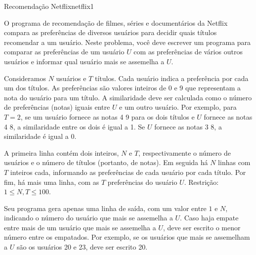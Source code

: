 \documentclass[12pt,a4paper,oneside]{article}
\begin{document}
\begin{problem}{Recomendação Netflix}{netflix}{1}

O programa de recomendação de filmes, séries e documentários da Netflix compara as preferências de diversos usuários para decidir quais títulos recomendar a um usuário. Neste problema, você deve escrever um programa para comparar as preferências de um usuário $U$ com as preferências de vários outros usuários e informar qual usuário mais se assemelha a $U$.

Consideramos $N$ usuários e $T$ títulos. Cada usuário indica a preferência por cada um dos títulos. As preferências são valores inteiros de 0 e 9 que representam a nota do usuário para um título. A similaridade deve ser calculada como o número de preferências (notas) iguais entre $U$ e um outro usuário. Por exemplo, para $T = 2$, se um usuário fornece as notas 4 9 para os dois títulos e $U$ fornece as notas 4 8, a similaridade entre os dois é igual a 1. Se $U$ fornece as notas 3 8, a similaridade é igual a 0.



\InputFile

A primeira linha contém dois inteiros, $N$ e $T$, respectivamente o número de usuários e o número de títulos (portanto, de notas). Em seguida há $N$ linhas com $T$ inteiros cada, informando as preferências de cada usuário por cada título. Por fim, há mais uma linha, com as $T$ preferências do usuário $U$. Restrição: $1 \leq N, T \leq 100$.

\OutputFile

Seu programa gera apenas uma linha de saída, com um valor entre $1$ e $N$, indicando o número do usuário que mais se assemelha a $U$. Caso haja empate entre mais de um usuário que mais se assemelha a $U$, deve ser escrito o menor número entre os empatados. Por exemplo, se os usuários que mais se assemelham a $U$ são os usuários 20 e 23, deve ser escrito 20.


\Example

\begin{example}
%
\end{example}

\begin{example}
%
\end{example}


\end{problem}
\end{document}
